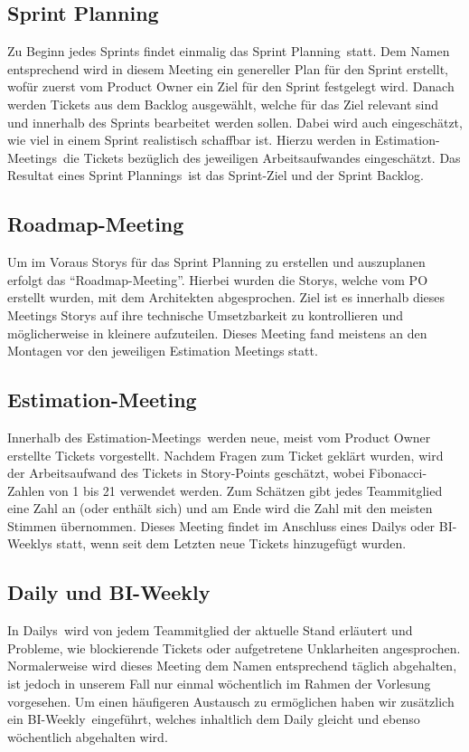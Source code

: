 \subsection{Sprint Planning}
Zu Beginn jedes Sprints findet einmalig das \glqq Sprint Planning\grqq~statt. Dem Namen entsprechend wird in diesem Meeting ein genereller Plan 
für den Sprint erstellt, wofür zuerst vom Product Owner ein Ziel für den Sprint festgelegt wird. Danach werden Tickets aus dem Backlog 
ausgewählt, welche für das Ziel relevant sind und innerhalb des Sprints bearbeitet werden sollen. Dabei wird auch eingeschätzt, wie viel in einem 
Sprint realistisch schaffbar ist. Hierzu werden in \glqq Estimation-Meetings\grqq~die Tickets bezüglich des jeweiligen Arbeitsaufwandes eingeschätzt.
Das Resultat eines \glqq Sprint Plannings\grqq~ist das Sprint-Ziel und der Sprint Backlog.

\subsection{Roadmap-Meeting}
Um im Voraus Storys für das Sprint Planning zu erstellen und auszuplanen erfolgt das \enquote{Roadmap-Meeting}.
Hierbei wurden die Storys, welche vom PO erstellt wurden, mit dem Architekten abgesprochen.
Ziel ist es innerhalb dieses Meetings Storys auf ihre technische Umsetzbarkeit zu kontrollieren und möglicherweise in kleinere aufzuteilen.
Dieses Meeting fand meistens an den Montagen vor den jeweiligen Estimation Meetings statt.

\subsection{Estimation-Meeting}
Innerhalb des \glqq Estimation-Meetings\grqq~werden neue, meist vom Product Owner erstellte Tickets vorgestellt. Nachdem Fragen zum Ticket
geklärt wurden, wird der Arbeitsaufwand des Tickets in Story-Points geschätzt, wobei Fibonacci-Zahlen von 1 bis 21 verwendet werden. Zum Schätzen
gibt jedes Teammitglied eine Zahl an (oder enthält sich) und am Ende wird die Zahl mit den meisten Stimmen übernommen. 
Dieses Meeting findet im Anschluss eines Dailys oder BI-Weeklys statt, wenn seit dem Letzten neue Tickets hinzugefügt wurden.

\subsection{Daily und BI-Weekly}
In \glqq Dailys\grqq~wird von jedem Teammitglied der aktuelle Stand erläutert und Probleme, wie blockierende Tickets oder aufgetretene 
Unklarheiten angesprochen. Normalerweise wird dieses Meeting dem Namen entsprechend täglich abgehalten, ist jedoch in unserem Fall nur einmal 
wöchentlich im Rahmen der Vorlesung vorgesehen. Um einen häufigeren Austausch zu ermöglichen haben wir zusätzlich ein 
\glqq BI-Weekly\grqq~eingeführt, welches inhaltlich dem Daily gleicht und ebenso wöchentlich abgehalten wird.

